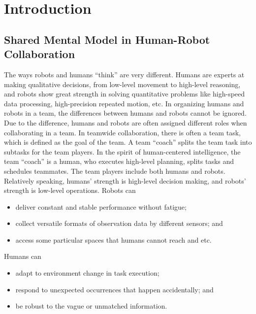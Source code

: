 \documentclass[phd]{byuprop}
\title{\Title}
\author{\Author}
\begin{document}
\maketitle

\section{Introduction}

\subsection{Shared Mental Model in Human-Robot Collaboration}

The ways robots and humans ``think'' are very different.
Humans are experts at making qualitative decisions, from low-level movement to high-level reasoning,
and robots show great strength in solving quantitative problems like high-speed data processing, high-precision repeated motion, etc.
In organizing humans and robots in a team, the differences between humans and robots cannot be ignored.
Due to the difference, humans and robots are often assigned different roles when collaborating in a team.
In teamwide collaboration, there is often a team task, which is defined as the goal of the team.
A team ``coach'' splits the team task into subtasks for the team players.
In the spirit of human-centered intelligence, the team ``coach'' is a human, who executes high-level planning, splits tasks and schedules teammates.
The team players include both humans and robots.
Relatively speaking, humans' strength is high-level decision making, and robots' strength is low-level operations.
Robots can
\begin{itemize}
\item deliver constant and stable performance without fatigue;
\item collect versatile formats of observation data by different sensors; and
\item access some particular spaces that humans cannot reach and etc.
\end{itemize}
Humans can
\begin{itemize}
\item adapt to environment change in task execution;
\item respond to unexpected occurrences that happen accidentally; and
\item be robust to the vague or unmatched information. 
\end{itemize}
  
\end{document}
